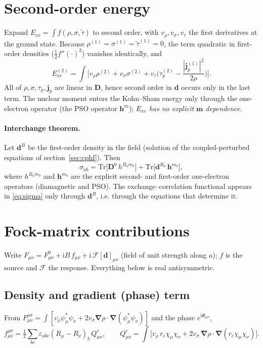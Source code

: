 \documentclass[11pt,a4paper]{article}
\newcommand{\grad}{\bm{\nabla}}
\newcommand{\jp}{\bm{j}_p}
\newcommand{\vt}{v_\tau}
\newcommand{\ttil}{\tilde\tau}
\newcommand{\Dm}{\mathbf{D}}
\newcommand{\ci}{\mathrm{i}}
\begin{document}
\section{Second-order energy}

Expand $E_{xc}=\int f(\rho,\sigma,\ttil)$ to second order, with $v_\rho,v_\sigma,\vt$ the first derivatives at the ground state. Because $\rho^{(1)}=\sigma^{(1)}=\ttil^{(1)}=0$, the term quadratic in first-order densities ($\tfrac12f''(\cdot)^2$) vanishes identically, and
\begin{equation}
E^{(2)}_{xc}=\int\Big[v_\rho\rho^{(2)}+v_\sigma\sigma^{(2)}+\vt\Big(\tau_p^{(2)}-\frac{|\jp^{(1)}|^2}{2\rho}\Big)\Big].
\label{eq:E2}
\end{equation}
All of $\rho,\sigma,\tau_p,\jp$ are linear in $\Dm$, hence second order in $\bm d$ occurs only in the last term. The nuclear moment enters the Kohn--Sham energy only through the one-electron operator (the PSO operator $\bm h^m$); \emph{$E_{xc}$ has no explicit $\bm m$ dependence}.

\paragraph{Interchange theorem.}
Let $\bm d^B$ be the first-order density in the field (solution of the coupled-perturbed equations of section~\ref{sec:cphf}). Then
\begin{equation}
\sigma_{ab}=\mathrm{Tr}\big[\Dm^0\,h^{B_am_b}\big]+\mathrm{Tr}\big[\bm d^{B_a}\,\bm h^{m_b}\big],
\label{eq:sigma}
\end{equation}
where $h^{B_am_b}$ and $\bm h^{m_b}$ are the explicit second- and first-order one-electron operators (diamagnetic and PSO). The exchange--correlation functional appears in \eqref{eq:sigma} only through $\bm d^{B}$, i.e. through the equations that determine it.

\section{Fock-matrix contributions}

Write $F_{\mu\nu}=F^0_{\mu\nu}+\ci B\,f_{\mu\nu}+\ci\,\mathcal F[\bm d]_{\mu\nu}$ (field of unit strength along $a$); $f$ is the source and $\mathcal F$ the response. Everything below is real antisymmetric.

\subsection{Density and gradient (phase) term}
From $F^{\rho\sigma}_{\mu\nu}=\int[v_\rho\psi^*_\mu\psi_\nu+2v_\sigma\grad\rho\cdot\grad(\psi_\mu^*\psi_\nu)]$ and the phase $e^{\ci\Phi_{\mu\nu}}$,
\begin{equation}
f^{\rho\sigma}_{\mu\nu}=\tfrac12\sum_{bc}\varepsilon_{abc}(R_\mu-R_\nu)_b\,Q^c_{\mu\nu},\qquad
Q^c_{\mu\nu}=\int\Big[v_\rho\,r_c\chi_\mu\chi_\nu+2v_\sigma\,\grad\rho\cdot\grad(r_c\chi_\mu\chi_\nu)\Big].
\label{eq:frs}
\end{equation}
\end{document}
